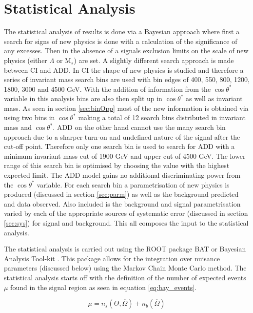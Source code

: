 \chapter{Statistical Analysis}
    \label{ch:stat}

	The statistical analysis of results is done via a Bayesian approach where first a search for signs of new physics is done with a calculation of the significance of any excesses. Then in the absence of a signals exclusion limits on the scale of new physics (either $\Lambda$ or M$_{s}$) are set. A slightly different search approach is made between CI and ADD. In CI the shape of new physics is studied and therefore a series of invariant mass search bins are used with bin edges of 400, 550, 800, 1200, 1800, 3000 and 4500 GeV. With the addition of information from the $\cos{\theta^{*}}$ variable in this analysis bins are also then split up in $\cos{\theta^{*}}$ as well as invariant mass. As seen in section \ref{sec:binOpp} most of the new information is obtained via using two bins in $\cos{\theta^{*}}$ making a total of 12 search bins distributed in invariant mass and $\cos{\theta^{*}}$. ADD on the other hand cannot use the many search bin approach due to a sharper turn-on and undefined nature of the signal after the cut-off point. Therefore only one search bin is used to search for ADD with a minimum invariant mass cut of 1900 GeV and upper cut of 4500 GeV. The lower range of this search bin is optimised by choosing the value with the highest expected limit. The ADD model gains no additional discriminating power from the $\cos{\theta^{*}}$ variable. For each search bin a parametrisation of new physics is produced (discussed in section \ref{sec:parm}) as well as the background predicted and data observed. Also included is the background and signal parametrisation varied by each of the appropriate sources of systematic error (discussed in section \ref{sec:sys}) for signal and background. This all composes the input to the statistical analysis. 


    The statistical analysis is carried out using the ROOT \cite{Antcheva20092499} package BAT or Bayesian Analysis Tool-kit \cite{Caldwell20092197}. This package allows for the integration over nuisance parameters (discussed below) using the Markov Chain Monte Carlo method.  The statistical analysis starts off with the definition of the number of expected events $\mu$ found in the signal region as seen in equation \ref{eq:bay_events}.

	\begin{equation}
		\mu = n_{s}(\Theta,\overline{\Omega}) + n_{b}(\overline{\Omega})
    	\label{eq:bay_events}
    \end{equation}

